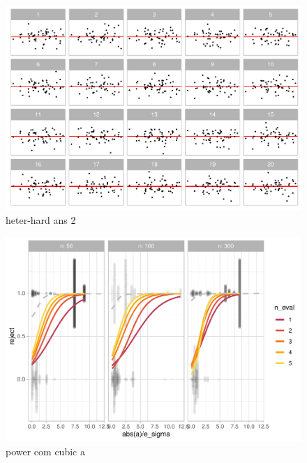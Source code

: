 \documentclass[]{interact}
\theoremstyle{plain}%
\theoremstyle{definition}
\theoremstyle{remark}
\begin{document}
\begin{figure}
\centering
\includegraphics{paper_comparison_files/figure-latex/heter-hard-1.pdf}
\caption{\label{fig:heter-hard}heter-hard ans 2}
\end{figure}

\begin{figure}
\centering
\includegraphics{paper_comparison_files/figure-latex/power-com-cubic-a-1.pdf}
\caption{\label{fig:power-com-cubic-a}power com cubic a}
\end{figure}
\end{document}
